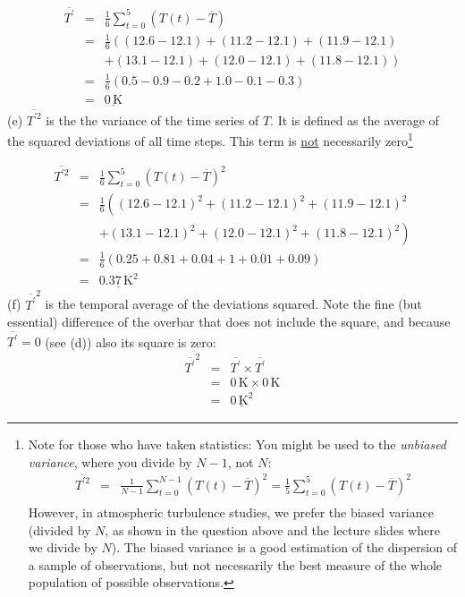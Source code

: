 \documentclass[11pt]{article}
\begin{document}
\begin{enumerate}
\begin{eqnarray*}
\overline{T^{\prime}} &=& \frac{1}{6} \sum_{t=0}^{5} (T(t)-\overline{T}) \\
&=& \frac{1}{6} \left( (12.6-12.1) + (11.2-12.1) + (11.9-12.1) \right. \\
&& \left. + (13.1-12.1) + (12.0-12.1) + (11.8-12.1) \right) \\
&=& \frac{1}{6} \left( 0.5 - 0.9 -0.2 + 1.0 - 0.1 - 0.3 \right) \\
&=& \underline{0\,\textrm{K}}
\end{eqnarray*}
(e) $\overline{T^{\prime 2}}$ is the the variance of the time series of $T$. It is defined as the average of the squared deviations of all time steps. This term is \underline{not} necessarily zero\footnote{Note for those who have taken statistics: You might be used to the \emph{unbiased variance}, where you divide by $N-1$, not $N$:
\begin{eqnarray*}
\overline{T^{\prime 2}} &=& \frac{1}{N-1} \sum_{t=0}^{N-1} (T(t)-\overline{T})^2 = \frac{1}{5} \sum_{t=0}^{5} (T(t)-\overline{T})^2 \\
\end{eqnarray*}
However, in atmospheric turbulence studies, we prefer the biased variance (divided by $N$, as shown in the question above and the lecture slides where we divide by $N$). The biased variance is a good estimation of the dispersion of a sample of observations, but not necessarily the best measure of the whole population of possible observations.
}

\begin{eqnarray*}
\overline{T^{\prime 2}} &=& \frac{1}{6} \sum_{t=0}^{5} (T(t)-\overline{T})^2 \\
&=& \frac{1}{6} \left( (12.6-12.1)^2 + (11.2-12.1)^2 + (11.9-12.1) ^2\right. \\
&& \left. + (13.1-12.1)^2 + (12.0-12.1)^2 + (11.8-12.1)^2 \right) \\
&=& \frac{1}{6} \left( 0.25 + 0.81 + 0.04 + 1 + 0.01 + 0.09 \right) \\
&=& \underline{0.37\,\textrm{K}^2}
\end{eqnarray*}
(f) $\overline{T^{\prime}}^2$ is the temporal average of the deviations squared. Note the fine (but essential) difference of the overbar that does not include the square, and because $\overline{T^{\prime}} = 0$ (see (d)) also its square is zero:
\begin{eqnarray*}
\overline{T^{\prime}}^2 &=& \overline{T^{\prime}} \times \overline{T^{\prime}} \\
&=& 0\,\textrm{K} \times 0\,\textrm{K} \\
&=& \underline{0\,\textrm{K}^2}
\end{eqnarray*}


\end{enumerate}
\end{document}
